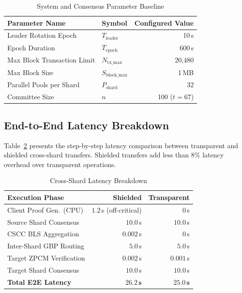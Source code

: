 \documentclass[sigconf,nonacm]{acmart}
\begin{document}
\begin{table}[H]
\centering
\caption{System and Consensus Parameter Baseline}
\label{tab:system_params}
\small
\begin{tabular}{llr}
\toprule
\textbf{Parameter Name} & \textbf{Symbol} & \textbf{Configured Value} \\
\midrule
Leader Rotation Epoch & $T_{\text{leader}}$ & 10\,s \\
Epoch Duration & $T_{\text{epoch}}$ & 600\,s \\
Max Block Transaction Limit & $N_{\text{tx\_max}}$ & 20{,}480 \\
Max Block Size & $S_{\text{block\_max}}$ & 1\,MB \\
Parallel Pools per Shard & $P_{\text{shard}}$ & 32 \\
Committee Size & $n$ & 100 ($t=67$) \\
\bottomrule
\end{tabular}
\end{table}

\subsection{End-to-End Latency Breakdown}
Table~\ref{tab:latency_breakdown} presents the step-by-step latency comparison between transparent and shielded cross-shard transfers. Shielded transfers add less than $8\%$ latency overhead over transparent operations.

\begin{table}[H]
\centering
\caption{Cross-Shard Latency Breakdown}
\label{tab:latency_breakdown}
\small
\begin{tabular}{lrr}
\toprule
\textbf{Execution Phase} & \textbf{Shielded} & \textbf{Transparent} \\
\midrule
Client Proof Gen.\ (CPU) & $1.2$\,s (off-critical) & $0$\,s \\
Source Shard Consensus & $10.0$\,s & $10.0$\,s \\
CSCC BLS Aggregation & $0.002$\,s & $0$\,s \\
Inter-Shard GBP Routing & $5.0$\,s & $5.0$\,s \\
Target ZPCM Verification & $0.002$\,s & $0.001$\,s \\
Target Shard Consensus & $10.0$\,s & $10.0$\,s \\
\midrule
\textbf{Total E2E Latency} & $\mathbf{26.2\,\text{s}}$ & $\mathbf{25.0\,\text{s}}$ \\
\bottomrule
\end{tabular}
\end{table}
\end{document}
